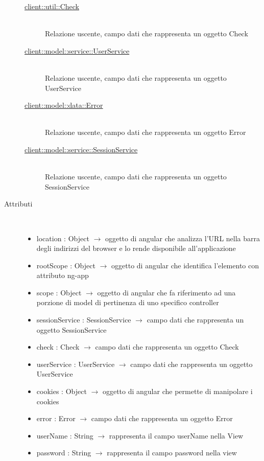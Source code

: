 \begin{description}
\vspace{-7mm}
\begin{description}
	\item[\hyperlink{client::util::Check}{client::util::Check}] \hfill \\
	Relazione uscente, campo dati che rappresenta un oggetto Check
	\item[\hyperlink{client::model::service::UserService}{client::model::service::UserService}] \hfill \\
	Relazione uscente, campo dati che rappresenta un oggetto UserService
	\item[\hyperlink{client::model::data::Error}{client::model::data::Error}] \hfill \\
	Relazione uscente, campo dati che rappresenta un oggetto Error
	\item[\hyperlink{client::model::service::SessionService}{client::model::service::SessionService}] \hfill \\
	Relazione uscente, campo dati che rappresenta un oggetto SessionService
\end{description}

\item[Attributi] \hfill \\
\vspace{-7mm}
\begin{itemize}
	\item location : Object $\rightarrow$ oggetto di angular che analizza l'URL nella barra degli indirizzi del browser e lo rende disponibile all'applicazione
	\item rootScope : Object $\rightarrow$ oggetto di angular che identifica l’elemento con attributo ng-app
	\item scope : Object $\rightarrow$ oggetto di angular che fa riferimento ad una porzione di model di pertinenza di uno specifico controller
	\item sessionService : SessionService $\rightarrow$ campo dati che rappresenta un oggetto SessionService
	\item check : Check $\rightarrow$ campo dati che rappresenta un oggetto Check
	\item userService : UserService $\rightarrow$ campo dati che rappresenta un oggetto UserService
	\item cookies : Object $\rightarrow$ oggetto di angular che permette di manipolare i cookies
	\item error : Error $\rightarrow$ campo dati che rappresenta un oggetto Error
	\item userName : String $\rightarrow$ rappresenta il campo userName nella View
	\item password : String $\rightarrow$ rappresenta il campo password nella view
\end{itemize}


\end{description}
